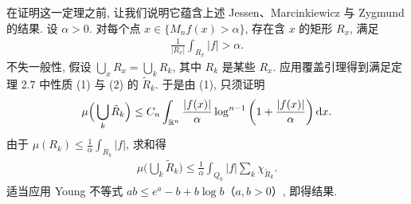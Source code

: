 在证明这一定理之前, 让我们说明它蕴含上述 Jessen、Marcinkiewicz 与 Zygmund 的结果. 设 $\alpha > 0$. 对每个点 $x \in \{M_n f(x) > \alpha\}$, 存在含 $x$ 的矩形 $R_x$, 满足
\begin{align*}
  \frac{1}{\left|R_{x}\right|}\int_{R_{x}}\left|f\right|>\alpha.
\end{align*}
不失一般性, 假设 $\bigcup_x R_x = \bigcup_k R_k$, 其中 $R_k$ 是某些 $R_x$. 应用覆盖引理得到满足定理 2.7 中性质 (1) 与 (2) 的 $\tilde{R}_k$. 于是由 (1), 只须证明
\begin{align*}
  \mu\Big(\bigcup_{k}\tilde{R}_{k}\Big)\leq C_{n}\int_{\mathbb{R}^{n}}\frac{|f(x)|}{\alpha}\log^{n-1}\left(1+\frac{|f(x)|}{\alpha}\right)\mathrm{d}x.
\end{align*}
由于 $\mu(R_k) \leq \frac{1}{\alpha} \int_{R_k} |f|$, 求和得
\begin{align*}
  \mu\Big(\bigcup_{k}\tilde{R}_{k}\Big)\leq\frac{1}{\alpha}\int_{Q_{0}}|f|\sum_{k}\chi_{\tilde{R}_{k}}.
\end{align*}
适当应用 Young 不等式 $ab \leq e^a - b + b\log b$（$a, b > 0$）, 即得结果.

